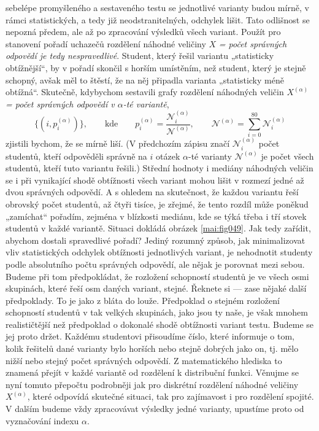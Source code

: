 \begin{example}
  sebelépe promyšleného a sestaveného testu se jednotlivé varianty budou mírně, v rámci 
  statistických, a tedy již neodstranitelných, odchylek lišit. Tato odlišnost se nepozná předem, 
  ale až po zpracování výsledků všech variant. Použít pro stanovení pořadí uchazečů rozdělení
  náhodné veličiny \(X\) \emph{= počet správných odpovědí je tedy nespravedlivé}. Student, který 
  řešil variantu „statisticky obtížnější“, by v pořadí skončil s horším umístěním, než student, 
  který je stejně schopný, avšak měl to štěstí, že na něj připadla varianta „statisticky méně 
  obtížná“. Skutečně, kdybychom sestavili grafy rozdělení náhodných veličin \(X^{(\alpha)}\) 
  \emph{= počet správných odpovědí v \(\alpha\)-té variantě},
  \begin{equation*}
    \lbrace(i,p_i^{(\alpha)})\rbrace,\qquad\text{kde}\qquad 
    p_i^{(\alpha)} = \dfrac{\mathcal{N}_i^{(\alpha)}}{\mathcal{N}^{(\alpha)}}, \qquad
    \mathcal{N}^{(\alpha)} = \sum_{i=0}^{80}\mathcal{N}_i^{(\alpha)}
  \end{equation*}
  zjistili bychom, že se mírně liší. (V předchozím zápisu značí \(\mathcal{N}_i^{(\alpha)}\) počet 
  studentů, kteří odpověděli správně na \(i\) otázek \(\alpha\)-té varianty 
  \(\mathcal{N}^{(\alpha)}\) je počet všech studentů, kteří tuto variantu řešili.) Střední hodnoty 
  i mediány náhodných veličin se i při vynikající shodě obtížnosti všech variant mohou lišit v 
  rozmezí jedné až dvou správných odpovědí. A s ohledem na skutečnost, že každou variantu řeší 
  obrovský počet studentů, až čtyři tisíce, je zřejmé, že tento rozdíl může poněkud „zamíchat“ 
  pořadím, zejména v blízkosti mediánu, kde se týká třeba i tří stovek studentů v každé variantě. 
  Situaci dokládá obrázek \ref{mai:fig049}. Jak tedy zařídit, abychom dostali spravedlivé pořadí? 
  Jediný rozumný způsob, jak minimalizovat vliv statistických odchylek obtížnosti jednotlivých 
  variant, je nehodnotit studenty podle absolutního počtu správných odpovědí, ale nějak je porovnat 
  mezi sebou. Budeme při tom předpokládat, že rozložení schopností studentů je ve všech osmi 
  skupinách, které řeší osm daných variant, stejné. Řeknete si — zase nějaké další předpoklady. To 
  je jako z bláta do louže. Předpoklad o stejném rozložení schopností studentů v tak velkých 
  skupinách, jako jsou ty naše, je však mnohem realističtější než předpoklad o dokonalé shodě 
  obtížnosti variant testu. Budeme se jej proto držet. Každému studentovi přisoudíme číslo,
  které informuje o tom, kolik řešitelů dané varianty bylo horších nebo stejně dobrých jako on, tj. 
  mělo nižší nebo stejný počet správných odpovědí. Z matematického hlediska to znamená přejít v 
  každé variantě od rozdělení k distribuční funkci. Věnujme se nyní tomuto přepočtu podrobněji jak 
  pro diskrétní rozdělení náhodné veličiny \(X^{(\alpha)}\), které odpovídá skutečné situaci, tak 
  pro zajímavost i pro rozdělení spojité. V dalším budeme vždy zpracovávat výsledky jedné varianty, 
  upustíme proto od vyznačování indexu \(\alpha\).


\end{example}
